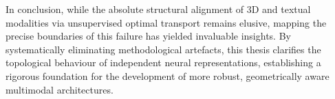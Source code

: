 In conclusion, while the absolute structural alignment of 3D and textual modalities via unsupervised optimal transport remains elusive, mapping the precise boundaries of this failure has yielded invaluable insights. By systematically eliminating methodological artefacts, this thesis clarifies the topological behaviour of independent neural representations, establishing a rigorous foundation for the development of more robust, geometrically aware multimodal architectures.